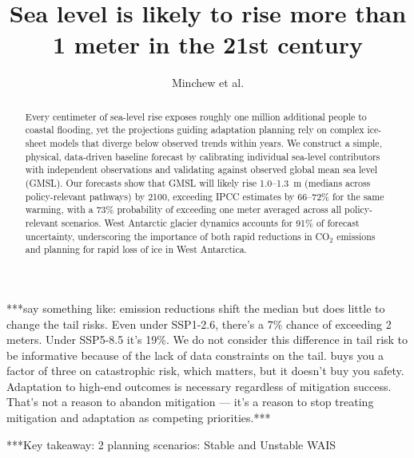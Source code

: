 \documentclass[12pt]{article}
\title{Sea level is likely to rise more than 1 meter in the 21st century}
\author{Minchew et al.}
\date{}
\begin{document}
\maketitle

\begin{abstract}
Every centimeter of sea-level rise exposes roughly one million additional people to coastal flooding, yet the projections guiding adaptation planning rely on complex ice-sheet models that diverge below observed trends within years. We construct a simple, physical, data-driven baseline forecast by calibrating individual sea-level contributors with independent observations and validating against observed global mean sea level (GMSL). Our forecasts show that GMSL will likely rise 1.0--1.3~m (medians across policy-relevant pathways) by 2100, exceeding IPCC estimates by 66--72\% for the same warming, with a 73\% probability of exceeding one meter averaged across all policy-relevant scenarios. West Antarctic glacier dynamics accounts for 91\% of forecast uncertainty, underscoring the importance of both rapid reductions in CO$_2$ emissions and planning for rapid loss of ice in West Antarctica.
\end{abstract}


***say something like: emission reductions shift the median but does little to change the tail risks. Even under SSP1-2.6, there's a 7\% chance of exceeding 2 meters. Under SSP5-8.5 it's 19\%. We do not consider this difference in tail risk to be informative because of the lack of data constraints on the tail. buys you a factor of three on catastrophic risk, which matters, but it doesn't buy you safety. Adaptation to high-end outcomes is necessary regardless of mitigation success. That's not a reason to abandon mitigation — it's a reason to stop treating mitigation and adaptation as competing priorities.***

***Key takeaway: 2 planning scenarios: Stable and Unstable WAIS 
\end{document}
